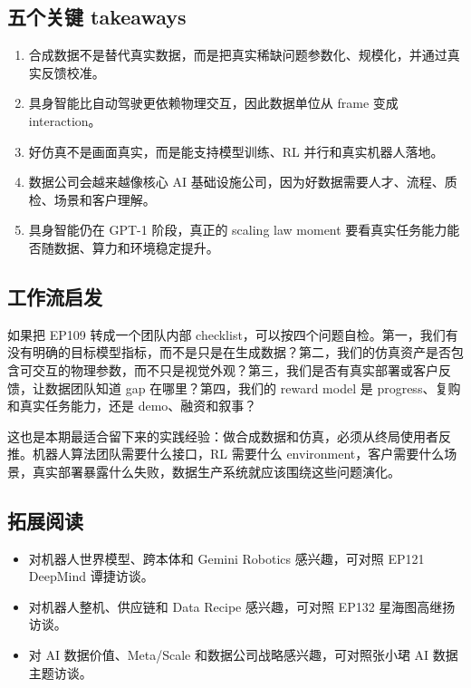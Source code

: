 \documentclass[a4paper]{article}
\begin{document}
\subsection{五个关键 takeaways}

\begin{enumerate}
\item 合成数据不是替代真实数据，而是把真实稀缺问题参数化、规模化，并通过真实反馈校准。
\item 具身智能比自动驾驶更依赖物理交互，因此数据单位从 frame 变成 interaction。
\item 好仿真不是画面真实，而是能支持模型训练、RL 并行和真实机器人落地。
\item 数据公司会越来越像核心 AI 基础设施公司，因为好数据需要人才、流程、质检、场景和客户理解。
\item 具身智能仍在 GPT-1 阶段，真正的 scaling law moment 要看真实任务能力能否随数据、算力和环境稳定提升。
\end{enumerate}

\subsection{工作流启发}

如果把 EP109 转成一个团队内部 checklist，可以按四个问题自检。第一，我们有没有明确的目标模型指标，而不是只是在生成数据？第二，我们的仿真资产是否包含可交互的物理参数，而不只是视觉外观？第三，我们是否有真实部署或客户反馈，让数据团队知道 gap 在哪里？第四，我们的 reward model 是 progress、复购和真实任务能力，还是 demo、融资和叙事？

这也是本期最适合留下来的实践经验：做合成数据和仿真，必须从终局使用者反推。机器人算法团队需要什么接口，RL 需要什么 environment，客户需要什么场景，真实部署暴露什么失败，数据生产系统就应该围绕这些问题演化。

\subsection{拓展阅读}

\begin{itemize}
\item 对机器人世界模型、跨本体和 Gemini Robotics 感兴趣，可对照 EP121 DeepMind 谭捷访谈。
\item 对机器人整机、供应链和 Data Recipe 感兴趣，可对照 EP132 星海图高继扬访谈。
\item 对 AI 数据价值、Meta/Scale 和数据公司战略感兴趣，可对照张小珺 AI 数据主题访谈。
\end{itemize}
\end{document}
